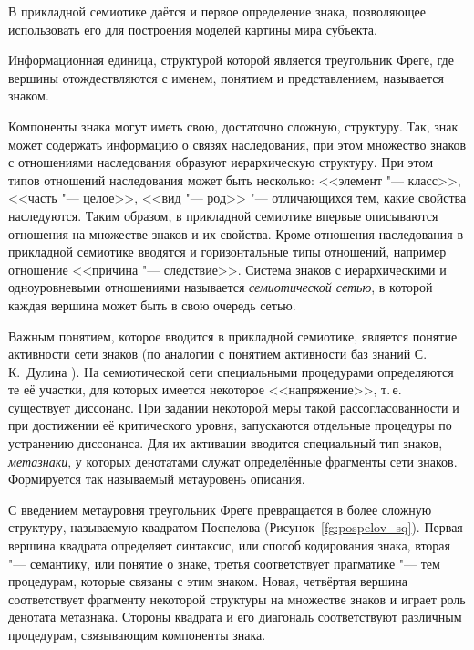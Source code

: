В прикладной семиотике даётся и первое определение знака, позволяющее использовать его для построения моделей картины мира субъекта.

\begin{Def}
	Информационная единица, структурой которой является треугольник Фреге, где вершины отождествляются с именем, понятием и представлением, называется знаком.
\end{Def}

Компоненты знака могут иметь свою, достаточно сложную, структуру. Так, знак может содержать информацию о связях наследования, при этом множество знаков с отношениями наследования образуют иерархическую структуру. При этом типов отношений наследования может быть несколько: <<элемент "--- класс>>, <<часть "--- целое>>, <<вид "--- род>> "--- отличающихся тем, какие свойства наследуются. Таким образом, в прикладной семиотике впервые описываются отношения на множестве знаков и их свойства. Кроме отношения наследования в прикладной семиотике вводятся и горизонтальные типы отношений, например отношение <<причина "--- следствие>>. Система знаков с иерархическими и одноуровневыми отношениями называется \textit{семиотической сетью}, в которой каждая вершина может быть в свою очередь сетью.

Важным понятием, которое вводится в прикладной семиотике, является понятие активности сети знаков (по аналогии с понятием активности баз знаний С.\,К.~Дулина \cite{Dulin2005}). На семиотической сети специальными процедурами определяются те её участки, для которых имеется некоторое <<напряжение>>, т.\,е. существует диссонанс. При задании некоторой меры такой рассогласованности и при достижении её критического уровня, запускаются отдельные процедуры по устранению диссонанса. Для их активации вводится специальный тип знаков, \textit{метазнаки}, у которых денотатами служат определённые фрагменты сети знаков. Формируется так называемый метауровень описания.

С введением метауровня треугольник Фреге превращается в более сложную структуру, называемую квадратом Поспелова \cite{Osipov2000b} (Рисунок~\ref{fg:pospelov_sq}). Первая вершина квадрата определяет синтаксис, или способ кодирования знака, вторая  "--- семантику, или понятие о знаке, третья соответствует прагматике "--- тем процедурам, которые связаны с этим знаком. Новая, четвёртая вершина соответствует фрагменту некоторой структуры на множестве знаков и играет роль денотата метазнака. Стороны квадрата и его диагональ соответствуют различным процедурам, связывающим компоненты знака. 

